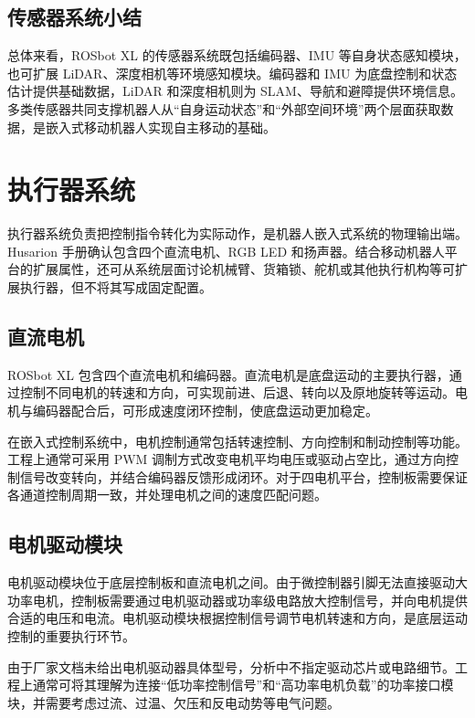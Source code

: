 \documentclass[UTF8,a4paper,12pt]{ctexrep}
\begin{document}
\subsection{传感器系统小结}

总体来看，ROSbot XL 的传感器系统既包括编码器、IMU 等自身状态感知模块，也可扩展 LiDAR、深度相机等环境感知模块。编码器和 IMU 为底盘控制和状态估计提供基础数据，LiDAR 和深度相机则为 SLAM、导航和避障提供环境信息。多类传感器共同支撑机器人从“自身运动状态”和“外部空间环境”两个层面获取数据，是嵌入式移动机器人实现自主移动的基础。

\section{执行器系统}

执行器系统负责把控制指令转化为实际动作，是机器人嵌入式系统的物理输出端。Husarion 手册确认包含四个直流电机、RGB LED 和扬声器。结合移动机器人平台的扩展属性，还可从系统层面讨论机械臂、货箱锁、舵机或其他执行机构等可扩展执行器，但不将其写成固定配置。

\subsection{直流电机}

ROSbot XL 包含四个直流电机和编码器。直流电机是底盘运动的主要执行器，通过控制不同电机的转速和方向，可实现前进、后退、转向以及原地旋转等运动。电机与编码器配合后，可形成速度闭环控制，使底盘运动更加稳定。

在嵌入式控制系统中，电机控制通常包括转速控制、方向控制和制动控制等功能。工程上通常可采用 PWM 调制方式改变电机平均电压或驱动占空比，通过方向控制信号改变转向，并结合编码器反馈形成闭环。对于四电机平台，控制板需要保证各通道控制周期一致，并处理电机之间的速度匹配问题。

\subsection{电机驱动模块}

电机驱动模块位于底层控制板和直流电机之间。由于微控制器引脚无法直接驱动大功率电机，控制板需要通过电机驱动器或功率级电路放大控制信号，并向电机提供合适的电压和电流。电机驱动模块根据控制信号调节电机转速和方向，是底层运动控制的重要执行环节。

由于厂家文档未给出电机驱动器具体型号，分析中不指定驱动芯片或电路细节。工程上通常可将其理解为连接“低功率控制信号”和“高功率电机负载”的功率接口模块，并需要考虑过流、过温、欠压和反电动势等电气问题。
\end{document}
